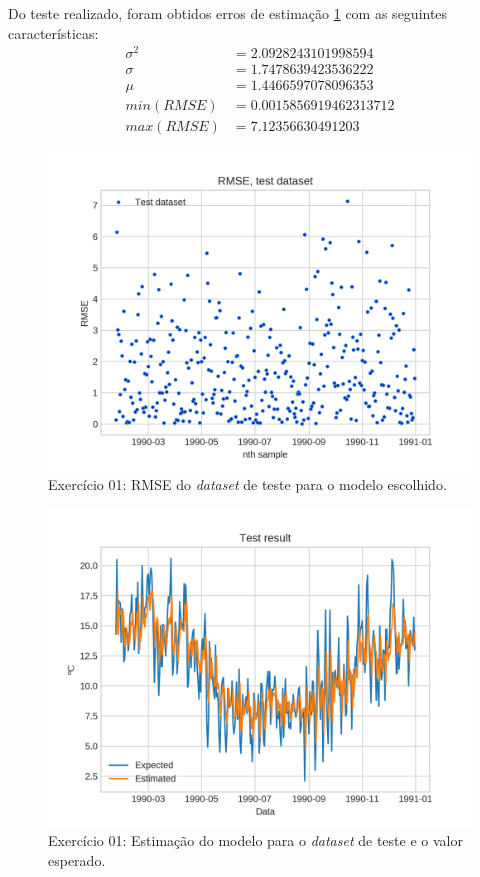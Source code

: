 \documentclass{article}
\begin{document}
    Do teste realizado, foram obtidos erros de estimação \ref{fig:ex1_kfold_rmse} com as seguintes características:
   \begin{align}
       \sigma^2&=2.0928243101998594\\
       \sigma&=1.7478639423536222\\
       \mu&=1.4466597078096353\\
       min(RMSE)&=0.0015856919462313712\\
       max(RMSE)&=7.12356630491203 
   \end{align}

   \begin{figure}[!h]
        \centering
        \includegraphics[width=\linewidth]{ex01/model.png}
        \caption{Exercício 01: RMSE do \textit{dataset} de teste para o modelo escolhido.}
        \label{fig:ex1_kfold_rmse}
    \end{figure}
    \begin{figure}[!h]
        \centering
        \includegraphics[width=\linewidth]{ex01/model_comp.png}
        \caption{Exercício 01: Estimação do modelo para o \textit{dataset} de teste e o valor esperado.}
        \label{fig:ex1_model_comp}
    \end{figure}
\end{document}
